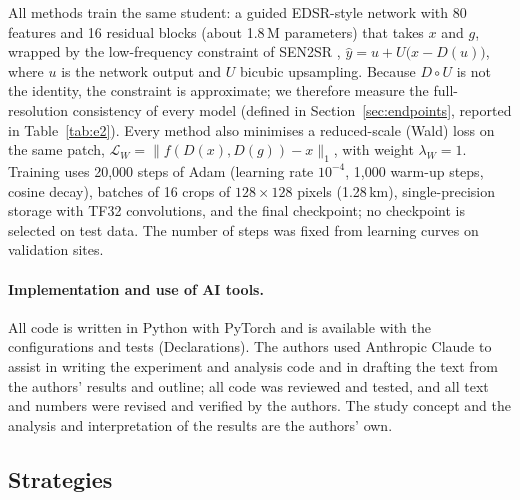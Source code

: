 \documentclass[pdflatex,sn-basic,referee,lineno]{sn-jnl}
\begin{document}
All methods train the same student: a guided EDSR-style network \citep{lim2017edsr} with 80 features and 16
residual blocks (about 1.8\,M parameters) that takes $x$ and $g$, wrapped by the low-frequency constraint of SEN2SR
\citep{aybar2026sen2sr}, $\hat y = u + U\big(x - D(u)\big)$, where $u$ is the network output and $U$ bicubic
upsampling. Because $D\circ U$ is not the identity, the constraint is approximate; we therefore measure the
full-resolution consistency of every model (defined in Section~\ref{sec:endpoints}, reported in
Table~\ref{tab:e2}). Every method also minimises a reduced-scale (Wald) loss on the same patch,
$\mathcal{L}_W = \lVert f(D(x), D(g)) - x\rVert_1$, with weight $\lambda_W=1$. Training uses 20,000 steps of
Adam (learning rate $10^{-4}$, 1,000 warm-up steps, cosine decay), batches of 16 crops of $128\times128$ pixels
(1.28\,km), single-precision storage with TF32 convolutions, and the final checkpoint; no checkpoint is selected
on test data. The number of steps was fixed from learning curves on validation sites.

\paragraph{Implementation and use of AI tools.} All code is written in Python with PyTorch and is available with the
configurations and tests (Declarations). The authors used Anthropic Claude to assist in writing the experiment and
analysis code and in drafting the text from the authors' results and outline; all code was reviewed and tested, and
all text and numbers were revised and verified by the authors. The study concept and the analysis and interpretation
of the results are the authors' own.

\subsection{Strategies}
\end{document}
